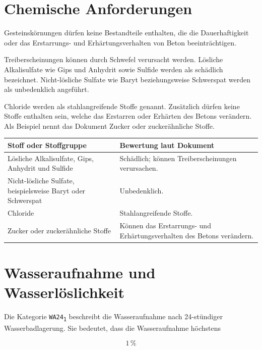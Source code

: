 \documentclass[
  12pt,
  a4paper,
  oneside
]{scrreprt}
\begin{document}
\section{Chemische Anforderungen}

Gesteinskörnungen dürfen keine Bestandteile enthalten, die die
Dauerhaftigkeit oder das Erstarrungs- und Erhärtungsverhalten von Beton
beeinträchtigen. 

Treiberscheinungen können durch Schwefel verursacht werden. Lösliche
Alkalisulfate wie Gips und Anhydrit sowie Sulfide werden als schädlich
bezeichnet. Nicht-lösliche Sulfate wie Baryt beziehungsweise
Schwerspat werden als unbedenklich angeführt. 

Chloride werden als stahlangreifende Stoffe genannt. Zusätzlich dürfen
keine Stoffe enthalten sein, welche das Erstarren oder Erhärten des
Betons verändern. Als Beispiel nennt das Dokument Zucker oder
zuckerähnliche Stoffe. 

\begin{longtable}{
  >{\raggedright\arraybackslash}p{}
  >{\raggedright\arraybackslash}p{}
}
\toprule
\textbf{Stoff oder Stoffgruppe} &
\textbf{Bewertung laut Dokument} \\
\midrule
\endhead

Lösliche Alkalisulfate, Gips, Anhydrit und Sulfide &
Schädlich; können Treiberscheinungen verursachen. \\

Nicht-lösliche Sulfate, beispielsweise Baryt oder Schwerspat &
Unbedenklich. \\

Chloride &
Stahlangreifende Stoffe. \\

Zucker oder zuckerähnliche Stoffe &
Können das Erstarrungs- und Erhärtungsverhalten des Betons verändern. \\

\bottomrule
\end{longtable}



\section{Wasseraufnahme und Wasserlöslichkeit}

Die Kategorie \texttt{WA24\textsubscript{1}} beschreibt die
Wasseraufnahme nach 24-stündiger Wasserbadlagerung. Sie bedeutet, dass
die Wasseraufnahme höchstens

\begin{equation}
  1\,\%
\end{equation}
\end{document}
